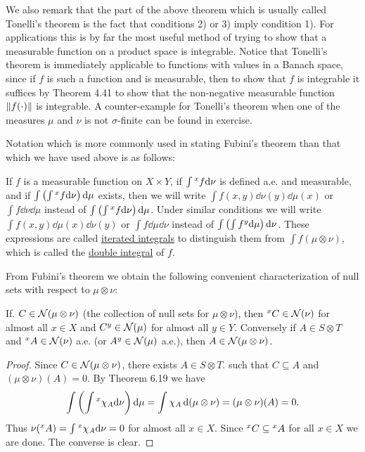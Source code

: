 We also remark that the part of the above theorem which is usually called Tonelli's theorem is the fact that conditions 2) or 3) imply condition 1). For applications this is by far the most useful method of trying to show that a measurable function on a product space is integrable. Notice that Tonelli's theorem is immediately applicable to functions with values in a Banach space, since if $f$ is such a function and is measurable, then to show that $f$ is integrable it suffices by Theorem 4.41 to show that the non-negative measurable function $\norm{f(\cdot)}$ is integrable. A counter-example for Tonelli's theorem when one of the measures $\mu$ and $\nu$ is not $\sigma$-finite can be found in exercise.

Notation which is more commonly used in stating Fubini's theorem than that which we have used above is as follows:

\begin{definition}
If $f$ is a measurable function on $X\times Y$, if $\int\xsec{f}{x}\dd\nu$ is defined a.e. and measurable, and if $\int\br{\int\xsec{f}{x}\dd\nu}\dd\mu$ exists, then we will write $\int f(x,y)\dd\nu(y)\dd\mu(x)$ or $\int f\dd\nu\dd\mu$ instead of $\int\br{\int\xsec{f}{x}\dd\nu}\dd\mu$. Under similar conditions we will write $\int f(x,y)\dd\mu(x)\dd\nu(y)$ or $\int f\dd\mu\dd\nu$ instead of $\int\br{\int\ysec{f}{y}\dd\mu}\dd\nu$. These expressions are called \underline{iterated integrals} to distinguish them from $\int f(\mu\otimes\nu)$, which is called the \underline{double integral} of $f$.
\end{definition}

From Fubini's theorem we obtain the following convenient characterization of null sets with respect to $\mu\otimes\nu$:

\begin{corollary}
If. $C\in\nring{\mu\otimes\nu}$ (the collection of null sets for $\mu\otimes\nu$), then $\xsec{C}{x}\in\nring{\nu}$ for almost all $x\in X$ and $\ysec{C}{y}\in\nring{\mu}$ for almost all $y\in Y$. Conversely if $A\in S\otimes T$ and $\xsec{A}{x}\in\nring{\nu}$ a.e. (or $\ysec{A}{y}\in\nring{\mu}$ a.e.), then $A\in\nring{\mu\otimes\nu}$.
\end{corollary}

\begin{proof}
Since $C\in\nring{\mu\otimes\nu}$, there exists $A\in S\otimes T$. such that $C\subseteq A$ and $(\mu\otimes\nu)(A)=0$. By Theorem 6.19 we have $$\int\br{\int\xsec{\idf{A}}{x}\dd\nu}\dd\mu=\int\idf{A}\dd(\mu\otimes\nu)=(\mu\otimes\nu)(A)=0.$$ Thus $\nu(\xsec{A}{x})=\int\xsec{\idf{A}}{x}\dd\nu=0$ for almost all $x\in X$. Since $\xsec{C}{x}\subseteq\xsec{A}{x}$ for all $x\in X$ we are done. The converse is clear.
\end{proof}


